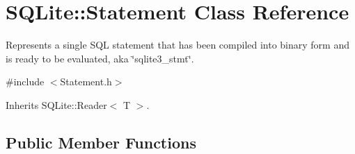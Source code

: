 \hypertarget{a00008}{\section{S\-Q\-Lite\-:\-:Statement Class Reference}
\label{a00008}
}


Represents a single S\-Q\-L statement that has been compiled into binary form and is ready to be evaluated, aka \char`\"{}sqlite3\-\_\-stmt\char`\"{}.  




{\ttfamily \#include $<$Statement.\-h$>$}



Inherits S\-Q\-Lite\-::\-Reader$<$ T $>$.

\subsection*{Public Member Functions}
